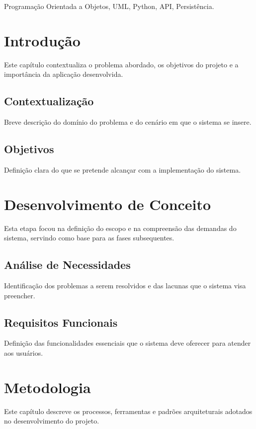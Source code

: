 \documentclass[conference]{IEEEtran}
\begin{document}
\begin{IEEEkeywords}
  Programação Orientada a Objetos, UML, Python, API, Persistência.
\end{IEEEkeywords}

\section{Introdução}
\label{sec:introducao}
Este capítulo contextualiza o problema abordado, os objetivos do
projeto e a importância da aplicação desenvolvida.

\subsection{Contextualização}
\label{subsec:contextualizacao}
Breve descrição do domínio do problema e do cenário em que o sistema se insere.

\subsection{Objetivos}
\label{subsec:objetivos}
Definição clara do que se pretende alcançar com a implementação do sistema.

\section{Desenvolvimento de Conceito}
\label{sec:conceito}
Esta etapa focou na definição do escopo e na compreensão das demandas
do sistema, servindo como base para as fases subsequentes.

\subsection{Análise de Necessidades}
Identificação dos problemas a serem resolvidos e das lacunas que o
sistema visa preencher.

\subsection{Requisitos Funcionais}
Definição das funcionalidades essenciais que o sistema deve oferecer
para atender aos usuários.

\section{Metodologia}
\label{sec:metodologia}
Este capítulo descreve os processos, ferramentas e padrões
arquiteturais adotados no desenvolvimento do projeto.
\end{document}
